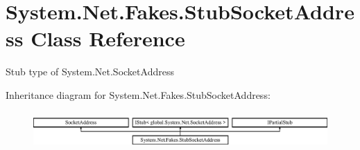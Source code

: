 \hypertarget{class_system_1_1_net_1_1_fakes_1_1_stub_socket_address}{\section{System.\-Net.\-Fakes.\-Stub\-Socket\-Address Class Reference}
\label{class_system_1_1_net_1_1_fakes_1_1_stub_socket_address}
}


Stub type of System.\-Net.\-Socket\-Address 


Inheritance diagram for System.\-Net.\-Fakes.\-Stub\-Socket\-Address\-:\begin{figure}[H]
\begin{center}
\leavevmode
\includegraphics[height=1.424936cm]{class_system_1_1_net_1_1_fakes_1_1_stub_socket_address}
\end{center}
\end{figure}

